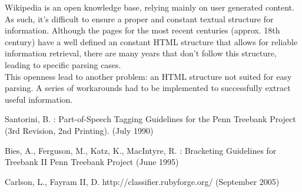 \documentclass{llncs}
\begin{document}
Wikipedia is an open knowledge base, relying mainly on user generated content. As such, it's difficult to ensure a proper and constant textual structure for information. Although the pages for the most recent centuries (approx. 18th century) have a well defined an constant HTML structure that allows for reliable information retrieval, there are many years that don't follow this structure, leading to specific parsing cases.\\

This openness lead to another problem: an HTML structure not suited for easy parsing. A series of workarounds had to be implemented to successfully extract useful information.

%
%
\begin{thebibliography}{}
%
Santorini, B. :
Part-of-Speech Tagging Guidelines for the
Penn Treebank Project (3rd Revision, 2nd Printing).
(July 1990)

Bies, A., Ferguson, M., Katz, K., MacIntyre, R. :
Bracketing Guidelines for Treebank II
Penn Treebank Project
(June 1995)

Carlson, L., Fayram II, D.
http://classifier.rubyforge.org/
(September 2005)

\end{thebibliography}
\end{document}
